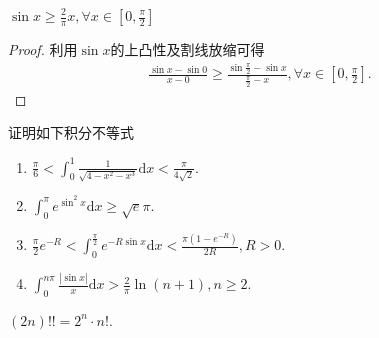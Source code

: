 \documentclass[../../main.tex]{subfiles}%
\begin{document}
\begin{theorem}[Jordan不等式]\label{theorem:Jordan不等式}
$\sin x\geqslant \frac{2}{\pi}x,\forall x\in [0,\frac{\pi}{2}]$
\end{theorem}
\begin{proof}

利用$\sin x$的上凸性及割线放缩可得
\begin{align*}
\frac{\sin x-\sin 0}{x-0}\geqslant \frac{\sin \frac{\pi}{2}-\sin x}{\frac{\pi}{2}-x},\forall x\in \left[ 0,\frac{\pi}{2} \right] .
\end{align*}

\end{proof}

\begin{example}
证明如下积分不等式
\begin{enumerate}
\item \(\frac{\pi}{6} < \int_{0}^{1}\frac{1}{\sqrt{4 - x^{2}-x^{3}}}\mathrm{d}x < \frac{\pi}{4\sqrt{2}}\).

\item \(\int_{0}^{\pi}e^{\sin^{2}x}\mathrm{d}x \geqslant \sqrt{e}\pi\).

\item \(\frac{\pi}{2}e^{-R} < \int_{0}^{\frac{\pi}{2}}e^{-R\sin x}\mathrm{d}x < \frac{\pi(1 - e^{-R})}{2R}, R > 0\).

\item $\int_0^{n\pi}{\frac{\left| \sin x \right|}{x}\mathrm{d}x}>\frac{2}{\pi}\ln \left( n+1 \right) ,n\geqslant 2.$
\end{enumerate}
\end{example}
\begin{remark}
$(2n)!!=2^n\cdot n!.$
\end{remark}
\end{document}

